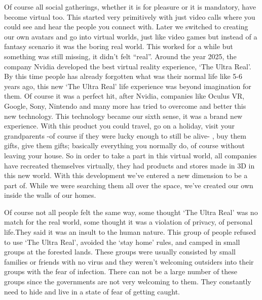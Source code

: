 \documentclass[]{book}
\begin{document}
Of course all social gatherings, whether it is for pleasure or it is mandatory, have become virtual too. This started very primitively with just video calls where you could see and hear the people you connect with. Later we switched to creating our own avatars and go into virtual worlds, just like video games but instead of a fantasy scenario it was the boring real world. This worked for a while but something was still missing, it didn't felt ``real''. Around the year 2025, the company Nvidia developed the best virtual reality experience, `The Ultra Real'. By this time people has already forgotten what was their normal life like 5-6 years ago, this new `The Ultra Real' life experience was beyond imagination for them. Of course it was a perfect hit, after Nvidia, companies like Oculus VR, Google, Sony, Nintendo and many more has tried to overcome and better this new technology. This technology became our sixth sense, it was a brand new experience. With this product you could travel, go on a holiday, visit your grandparents -of course if they were lucky enough to still be alive- , buy them gifts, give them gifts; basically everything you normally do, of course without leaving your house. So in order to take a part in this virtual world, all companies have recreated themselves virtually, they had products and stores made in 3D in this new world. With this development we've entered a new dimension to be a part of. While we were searching them all over the space, we've created our own inside the walls of our homes.

Of course not all people felt the same way, some thought `The Ultra Real' was no match for the real world, some thought it was a violation of privacy, of personal life.They said it was an insult to the human nature. This group of people refused to use `The Ultra Real', avoided the `stay home' rules, and camped in small groups at the forested lands. These groups were usually consisted by small families or friends with no virus and they weren't welcoming outsiders into their groups with the fear of infection. There can not be a large number of these groups since the governments are not very welcoming to them. They constantly need to hide and live in a state of fear of getting caught.
\end{document}
